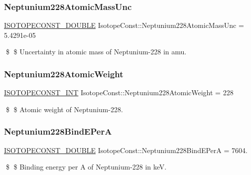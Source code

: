 \subsubsection{\texorpdfstring{Neptunium228\+Atomic\+Mass\+Unc}{Neptunium228AtomicMassUnc}}
{\footnotesize\ttfamily \mbox{\hyperlink{group___isotope_const-_macros_ga8f45a7272ce02c0b4c65c44636ed719a}{I\+S\+O\+T\+O\+P\+E\+C\+O\+N\+S\+T\+\_\+\+D\+O\+U\+B\+LE}} Isotope\+Const\+::\+Neptunium228\+Atomic\+Mass\+Unc = 5.\+4291e-\/05}

\$ \$ Uncertainty in atomic mass of Neptunium-\/228 in amu. \mbox{\label{group___isotope_const-_neptunium-_np228_ga2ccbfae4b2c36006384cf1d56d08ba66}} 
\subsubsection{\texorpdfstring{Neptunium228\+Atomic\+Weight}{Neptunium228AtomicWeight}}
{\footnotesize\ttfamily \mbox{\hyperlink{group___isotope_const-_macros_ga5f18360b3e99483a35c32d789e62621c}{I\+S\+O\+T\+O\+P\+E\+C\+O\+N\+S\+T\+\_\+\+I\+NT}} Isotope\+Const\+::\+Neptunium228\+Atomic\+Weight = 228}

\$ \$ Atomic weight of Neptunium-\/228. \mbox{\label{group___isotope_const-_neptunium-_np228_ga5d242138573e652e495ec3fc38bd2b93}} 
\subsubsection{\texorpdfstring{Neptunium228\+Bind\+E\+PerA}{Neptunium228BindEPerA}}
{\footnotesize\ttfamily \mbox{\hyperlink{group___isotope_const-_macros_ga8f45a7272ce02c0b4c65c44636ed719a}{I\+S\+O\+T\+O\+P\+E\+C\+O\+N\+S\+T\+\_\+\+D\+O\+U\+B\+LE}} Isotope\+Const\+::\+Neptunium228\+Bind\+E\+PerA = 7604.}

\$ \$ Binding energy per A of Neptunium-\/228 in keV. \mbox{\label{group___isotope_const-_neptunium-_np228_gaf5fe287982893cbc38d9f7ee930d6212}} 
